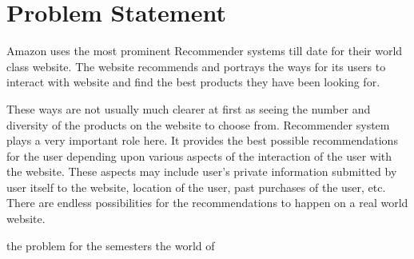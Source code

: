 
\section*{Problem Statement}
Amazon uses the most prominent Recommender systems till date for their world class website. The website recommends and portrays the ways for its users to interact with website and find the best products they have been looking for.

These ways are not usually much clearer at first as seeing the number and diversity of the products on the website to choose from. Recommender system plays a very important role here. It provides the best possible recommendations for the user depending upon various aspects of the interaction of the user with the website. These aspects may include user's private information submitted by user itself to the website, location of the user, past purchases of the user, etc. There are endless possibilities for the recommendations to happen on a real world website.

the problem for the semesters the world of 




